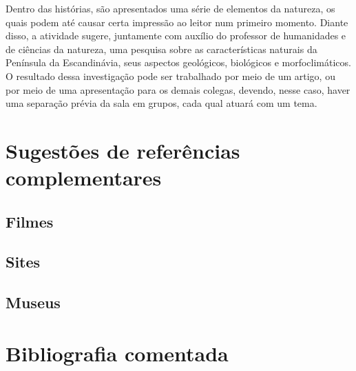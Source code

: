 \documentclass[12pt]{extarticle}
\begin{document}
Dentro das histórias, são apresentados uma série de elementos da
natureza, os quais podem até causar certa impressão ao leitor num
primeiro momento. Diante disso, a atividade sugere, juntamente com
auxílio do professor de humanidades e de ciências da natureza, uma
pesquisa sobre as características naturais da Península da
Escandinávia, seus aspectos geológicos, biológicos e morfoclimáticos.
O resultado dessa investigação pode ser trabalhado por meio de um
artigo, ou por meio de uma apresentação para os demais colegas,
devendo, nesse caso, haver uma separação prévia da sala em grupos,
cada qual atuará com um tema.

\section{Sugestões de referências complementares}

\subsection{Filmes}
\subsection{Sites}
\subsection{Museus}
\section{Bibliografia comentada}
\end{document}
